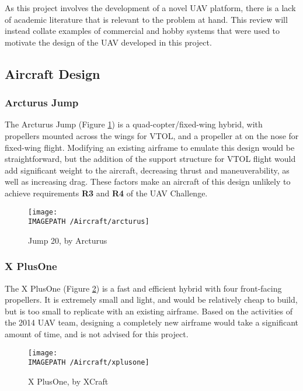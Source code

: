 As this project involves the development of a novel UAV platform, there is a lack of academic literature that is relevant to the problem at hand. This review will instead collate examples of commercial and hobby systems that were used to motivate the design of the UAV developed in this project.\\

\subsection{Aircraft Design}
\label{sec:litaircraft}
\subsubsection*{Arcturus Jump}
The Arcturus Jump \cite{ref:arcturus} (Figure \ref{fig:arcturus}) is a quad-copter/fixed-wing hybrid, with propellers mounted across the wings for VTOL, and a propeller at on the nose for fixed-wing flight. Modifying an existing airframe to emulate this design would be straightforward, but the addition of the support structure for VTOL flight would add significant weight to the aircraft, decreasing thrust and maneuverability, as well as increasing drag. These factors make an aircraft of this design unlikely to achieve requirements \textbf{R3} and \textbf{R4} of the UAV Challenge.

\begin{figure}[!h]
	\centering
	\texttt{[image: \\IMAGEPATH /Aircraft/arcturus]}
	\caption{Jump 20, by Arcturus}
	\label{fig:arcturus}
\end{figure}

\subsubsection*{X PlusOne}
The X PlusOne \cite{ref:xplusone} (Figure \ref{fig:xplusone}) is a fast and efficient hybrid with four front-facing propellers. It is extremely small and light, and would be relatively cheap to build, but is too small to replicate with an existing airframe. Based on the activities of the 2014 UAV team, designing a completely new airframe would take a significant amount of time, and is not advised for this project.

\begin{figure}[!ht]
	\centering
	\texttt{[image: \\IMAGEPATH /Aircraft/xplusone]}
	\caption{X PlusOne, by XCraft}
	\label{fig:xplusone}
\end{figure}

